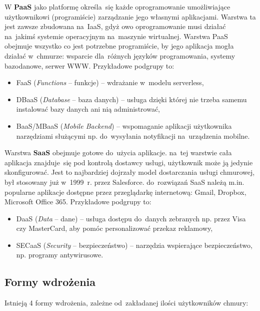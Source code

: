 \documentclass[12pt,a4paper,twoside,titlepage,openright]{book}
\begin{document}
W \textbf{PaaS} jako platformę określa~się każde oprogramowanie umożliwiające użytkownikowi (programiście) zarządzanie jego własnymi aplikacjami. Warstwa ta jest zawsze zbudowana na~IaaS, gdyż owo oprogramowanie musi działać na~jakimś systemie operacyjnym na~maszynie wirtualnej. Warstwa PaaS obejmuje wszystko co jest potrzebne programiście, by jego aplikacja mogła działać w~chmurze: wsparcie dla~różnych języków programowania, systemy bazodanowe, serwer WWW. Przykładowe podgrupy to:
\begin{itemize}
\item FaaS (\textit{Functions} -- funkcje) -- wdrażanie w~modelu serverless,
\item DBaaS (\textit{Database} -- baza danych) -- usługa dzięki której nie trzeba samemu instalować bazy danych ani nią administrować,
\item BaaS/MBaaS (\textit{Mobile Backend}) -- wspomaganie aplikacji użytkownika narzędziami służącymi np. do~wysyłania notyfikacji na~urządzenia mobilne.
\end{itemize}

Warstwa \textbf{SaaS} obejmuje gotowe do~użycia aplikacje. na~tej warstwie cała aplikacja znajduje~się pod kontrolą dostawcy usługi, użytkownik może ją jedynie skonfigurować. Jest to najbardziej dojrzały model dostarczania usługi chmurowej, był stosowany już w~1999~r. przez Salesforce. do~rozwiązań SaaS należą m.in. popularne aplikacje dostępne przez przeglądarkę internetową: Gmail, Dropbox, Microsoft Office 365. Przykładowe podgrupy to:
\begin{itemize}
\item DaaS (\textit{Data} -- dane) -- usługa dostępu do~danych zebranych np. przez Visa czy MasterCard, aby pomóc personalizować przekaz reklamowy,
\item SECaaS (\textit{Security} -- bezpieczeństwo) -- narzędzia wspierające bezpieczeństwo, np. programy antywirusowe.
\end{itemize}

\subsection{Formy wdrożenia}

Istnieją 4 formy wdrożenia, zależne od~zakładanej ilości użytkowników chmury:
\end{document}
